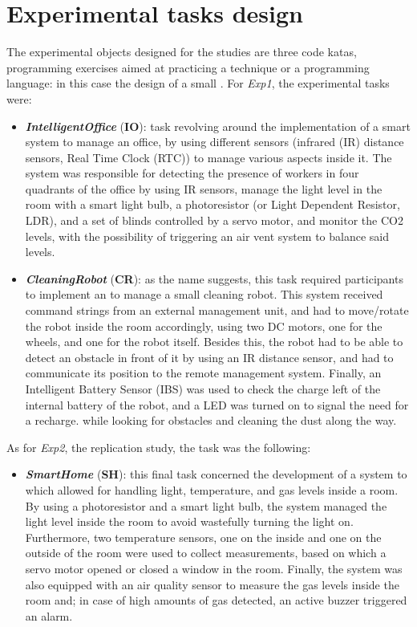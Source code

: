\section{Experimental tasks design}
The experimental objects designed for the studies are three code katas, \ie programming exercises aimed at practicing a technique or a programming language: in this case the design of a small \es. 
For \textit{Exp1}, the experimental tasks were:
\begin{itemize}
    \item \textbf{\textit{IntelligentOffice}} (\textbf{IO}): task revolving around the implementation of a smart system to manage an office, by using different sensors (\ie infrared (IR) distance sensors, Real Time Clock (RTC)) to manage various aspects inside it. The system was responsible for detecting the presence of workers in four quadrants of the office by using IR sensors, manage the light level in the room with a smart light bulb, a photoresistor (or Light Dependent Resistor, LDR), and a set of blinds controlled by a servo motor, and monitor the CO2 levels, with the possibility of triggering an air vent system to balance said levels.

    \item \textbf{\textit{CleaningRobot}} (\textbf{CR}): as the name suggests, this task required participants to implement an \es to manage a small cleaning robot. This system received command strings from an external management unit, and had to move/rotate the robot inside the room accordingly, using two DC motors, one for the wheels, and one for the robot itself. Besides this, the robot had to be able to detect an obstacle in front of it by using an IR distance sensor, and had to communicate its position to the remote management system. Finally, an Intelligent Battery Sensor (IBS) was used to check the charge left of the internal battery of the robot, and a LED was turned on to signal the need for a recharge.
    while looking for obstacles and cleaning the dust along the way. 
\end{itemize}

As for \textit{Exp2}, the replication study, the task was the following:
\begin{itemize}
    \item \textbf{\textit{SmartHome}} (\textbf{SH}): this final task concerned the development of a system to
    which allowed for handling light, temperature, and gas levels inside a room. By using a photoresistor and a smart light bulb, the system managed the light level inside the room to avoid wastefully turning the light on. Furthermore, two temperature sensors, one on the inside and one on the outside of the room were used to collect measurements, based on which a servo motor opened or closed a window in the room. Finally, the system was also equipped with an air quality
    sensor to measure the gas levels inside the room and; in case of high amounts of gas detected, an active buzzer triggered an alarm.
\end{itemize}

